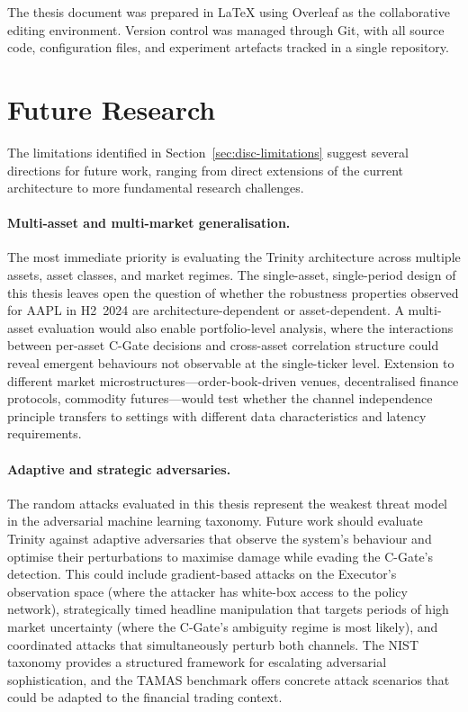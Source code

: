 The thesis document was prepared in \LaTeX{} using Overleaf as the
collaborative editing environment. Version control was managed through Git,
with all source code, configuration files, and experiment artefacts tracked
in a single repository.

\section{Future Research}
\label{sec:disc-future}

The limitations identified in Section~\ref{sec:disc-limitations} suggest
several directions for future work, ranging from direct extensions of the
current architecture to more fundamental research challenges.

\paragraph{Multi-asset and multi-market generalisation.}
The most immediate priority is evaluating the Trinity architecture across
multiple assets, asset classes, and market regimes. The single-asset, single-period
design of this thesis leaves open the question of whether the robustness
properties observed for AAPL in H2~2024 are architecture-dependent or
asset-dependent. A multi-asset evaluation would also enable portfolio-level
analysis, where the interactions between per-asset C-Gate decisions and
cross-asset correlation structure could reveal emergent behaviours not
observable at the single-ticker level. Extension to different market
microstructures---order-book-driven venues, decentralised finance protocols,
commodity futures---would test whether the channel independence principle
transfers to settings with different data characteristics and latency
requirements.

\paragraph{Adaptive and strategic adversaries.}
The random attacks evaluated in this thesis represent the weakest threat
model in the adversarial machine learning taxonomy. Future work should
evaluate Trinity against adaptive adversaries that observe the system's
behaviour and optimise their perturbations to maximise damage while evading
the C-Gate's detection. This could include gradient-based attacks on the
Executor's observation space (where the attacker has white-box access to the
policy network), strategically timed headline manipulation that targets
periods of high market uncertainty (where the C-Gate's ambiguity regime is
most likely), and coordinated attacks that simultaneously perturb both
channels. The NIST taxonomy \cite{vassilev2023nist} provides a structured
framework for escalating adversarial sophistication, and the TAMAS benchmark
\cite{kavathekar2025tamas} offers concrete attack scenarios that could be
adapted to the financial trading context.

